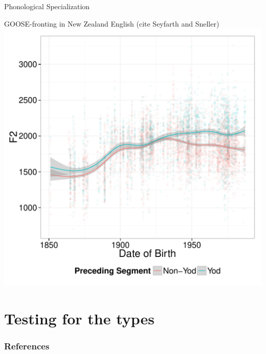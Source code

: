 \documentclass[hyperref={pdfpagelabels=false}]{beamer}
\begin{document}
\begin{frame}{Phonological Specialization}

\begin{center}
GOOSE-fronting in New Zealand English (cite Seyfarth and Sneller) %
\includegraphics[width=.8\textwidth]{ByTokenOldPreceding.pdf}
\end{center}

\end{frame}


\section{Testing for the types}

\begin{frame}[allowframebreaks]
\frametitle{References}
\newcommand*{\newblock}{natbib}


\end{frame}
\end{document}

